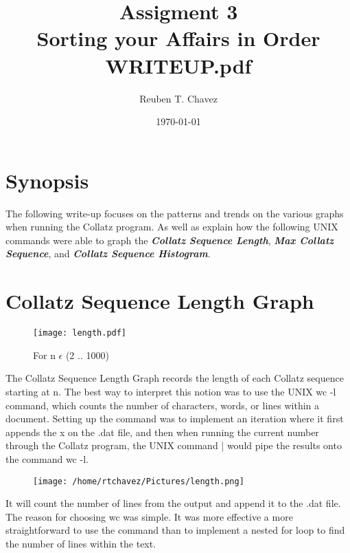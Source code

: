 \documentclass[11pt]{article} %
\title{Assigment 3 \\
    \large Sorting your Affairs in Order\\
     \textbf{WRITEUP.pdf}}
\author{Reuben T. Chavez}
\date{\today} %
\begin{document}
\maketitle %



\pagebreak

\section*{Synopsis}
The following write-up focuses on the patterns and trends on the various
graphs when running the Collatz program. As well as explain how the
following UNIX commands were able to graph the \textbf{\emph{Collatz Sequence Length}}, \textbf{\emph{
Max Collatz Sequence}}, and \textbf{\emph{ Collatz Sequence Histogram}}. 

\pagebreak
\section*{Collatz Sequence Length Graph}

\begin{figure}[htp]
\centering
\texttt{[image: length.pdf]}
\caption{For n $ \epsilon $ (2 .. 1000)}
\label{Collatz Sequence Length}
\end{figure}

\begin{flushleft}

The Collatz Sequence Length Graph records the length of each Collatz sequence starting at n.
The best way to interpret this notion was to use the UNIX wc -l command, which counts the 
number of characters, words, or lines within a document. Setting up the command was to implement
an iteration where it first appends the x on the .dat file, and then when running the current
number through the Collatz program, the UNIX command | would pipe the results onto the command 
wc -l.

\begin{figure}[htp]
\centering
\texttt{[image: /home/rtchavez/Pictures/length.png]}
\caption{}
\label{}
\end{figure}

 It will count the number of lines from the output and append it to the .dat file.
The reason for choosing wc was simple. It was more effective a more straightforward to use the 
command than to implement a nested for loop to find the number of lines within the text.

\end{flushleft}
\end{document}
